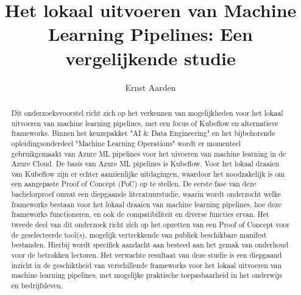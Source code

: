 \documentclass{hogent-article}
\title{Het lokaal uitvoeren van Machine Learning Pipelines: Een vergelijkende studie}
\author{Ernst Aarden}
\begin{document}
\begin{abstract}
  Dit onderzoeksvoorstel richt zich op het verkennen van mogelijkheden voor het lokaal uitvoeren van machine learning pipelines, met een focus of Kubeflow en alternatieve frameworks.
  Binnen het keuzepakket "AI \& Data Engineering" en het bijbehorende opleidingsonderdeel "Machine Learning Operations" wordt er momenteel gebruikgemaakt van Azure ML pipelines voor het uivoeren van machine learning in de Azure Cloud.
  De basis van Azure ML pipelines is Kubeflow. Voor het lokaal draaien van Kubeflow zijn er echter aanzienlijke uitdagingen, waardoor het noodzakelijk is om een aangepaste Proof of Concept (PoC) op te stellen.
  De eerste fase van deze bachelorproef omvat een diepgaande literatuurstudie, waarin wordt onderzocht welke frameworks bestaan voor het lokaal draaien van machine learning pipelines, hoe deze frameworks functioneren, en ook de compatibiliteit en diverse functies ervan.
  Het tweede deel van dit onderzoek richt zich op het opzetten van een Proof of Concept voor de geselecteerde tool(s), mogelijk vertrekkende van publiek beschikbare manifest bestanden. Hierbij wordt specifiek aandacht aan besteed aan het gemak van onderhoud voor de betrokken lectoren.
  Het verwachte resultaat van deze studie is een diepgaand inzicht in de geschiktheid van verschillende frameworks voor het lokaal uitvoeren van machine learning pipelines, met mogelijke praktische toepasbaarheid in het onderwijs en bedrijfsleven.
\end{abstract}

\tableofcontents



\printbibliography[heading=bibintoc]
\end{document}
